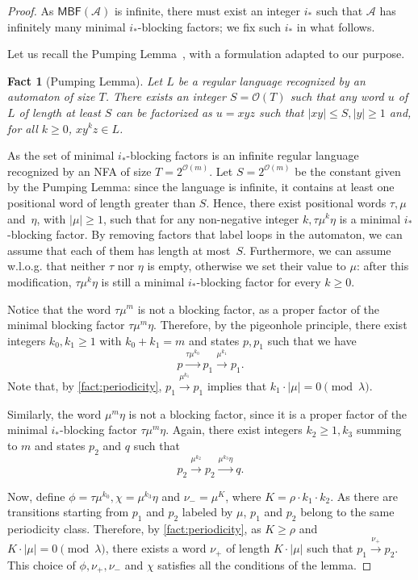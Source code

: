 \documentclass[letterpaper, USenglish, cleveref, autoref, thm-restate, numberwithinsect]{lipics-v2021}
\theoremstyle{theorem}
\newtheorem{fact}[theorem]{Fact}
\theoremstyle{definition}
\newcommand{\Aa}{\mathcal{A}}
\newcommand{\cO}{\mathcal{O}}
\newcommand{\MBF}{\textsf{MBF}\xspace}
\begin{document}
\begin{proof}
    As $\MBF(\Aa)$ is infinite, there must exist an integer $i_*$ such that $\Aa$ has infinitely many minimal $i_*$-blocking factors; we fix such $i_*$ in what follows.

    Let us recall the Pumping Lemma~\cite[Chapter 1, Proposition 2.2]{Pin2021}, with a formulation adapted to our purpose.
    \begin{fact}[Pumping Lemma]
        Let $L$ be a regular language recognized by an automaton of size $T$.
        There exists an integer $S = \cO(T)$ such that any word $u$ of $L$ of length at least $S$ can be factorized as $u=xyz$
        such that $|xy| \le S, |y| \ge 1$ and, for all $k \ge 0$, $xy^kz \in L$.
    \end{fact}
    As the set of minimal $i_*$-blocking factors is an infinite regular language recognized by an NFA of size $T = 2^{\cO(m)}$.
    Let $S = 2^{\cO(m)}$ be the constant given by the Pumping Lemma: since the language is infinite, it contains at least one positional word of length greater than $S$.
    Hence, there exist positional words $\tau, \mu$ and~$\eta$, with $|\mu|\ge 1$, such that for any non-negative integer $k, \tau\mu^k\eta$ is a minimal $i_*$-blocking factor.
    By removing factors that label loops in the automaton, we can assume that each of them has length at most~$S$.
    Furthermore, we can assume w.l.o.g. that neither $\tau$ nor $\eta$ is empty, otherwise we set their value to $\mu$: after this modification, $\tau\mu^k\eta$ is still a minimal $i_*$-blocking factor for every $k\ge 0$.

    Notice that the word $\tau\mu^{m}$ is not a blocking factor, as a proper factor of the minimal blocking factor $\tau\mu^{m}\eta$. Therefore, by the pigeonhole principle, there exist integers ${k_0}, k_1 \ge 1$ with ${k_0} + k_1 = m$ and states $p, p_1$ such that we have 
    \[p \xrightarrow{\tau\mu^{k_0}} p_1 \xrightarrow{\mu^{k_1}} p_1.\]
    Note that, by \cref{fact:periodicity}, $p_1 \xrightarrow{\mu^{k_1}} p_1$ implies that $k_1 \cdot |\mu| = 0\pmod{\lambda}$.

    Similarly, the word $\mu^{m}\eta$ is not a blocking factor, since it is a proper factor of the minimal $i_*$-blocking factor $\tau \mu^{m}\eta$.
    Again, there exist integers $k_2 \ge 1, {k_3}$ summing to $m$ and states $p_2 $ and $q$ such that
    \[p_2 \xrightarrow{\mu^{k_2}} p_2 \xrightarrow{\mu^{k_3}\eta} q.\]

    Now, define $\phi = \tau\mu^{k_0}, \chi = \mu^{k_3} \eta$ and $\nu_- = \mu^{K}$, where $K = \rho\cdot k_1\cdot k_2$.
    As there are transitions starting from $p_1$ and $p_2$ labeled by $\mu$, $p_1$ and $p_2$ belong to the same periodicity class.
    Therefore, by \cref{fact:periodicity}, as $K\ge \rho$ and $K\cdot|\mu|= 0\pmod{\lambda}$, 
    there exists a word $\nu_+$ of length $K\cdot|\mu|$ such that $p_1\xrightarrow{\nu_+}p_2$.
    This choice of $\phi,\nu_+,\nu_-$ and $\chi$ satisfies all the conditions of the lemma.
\end{proof}
\end{document}
